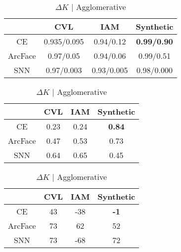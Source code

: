 \begin{table}[ht]
{        \hfill
        \begin{subtable}{0.4\linewidth}
            \centering
            \caption{RI / ARI | K-Means}
            \begin{tabular}{|c|c|c|c|}
            \hline
                & CVL & IAM & Synthetic \\
            \hline
            CE & 0.935/0.095 & 0.94/0.12 & \textbf{0.99/0.90} \\
            ArcFace & 0.97/0.05 & 0.94/0.06 & 0.99/0.51 \\
            SNN & 0.97/0.003 & 0.93/0.005 & 0.98/0.000 \\
            \hline
            \end{tabular}
        \end{subtable}
    }
    \baselineskip
    \hspace*{-4em}\scalebox{0.75} {
        \begin{subtable}{0.4\linewidth}
            \centering
            \caption{Silhouette Score | Agglomerative}
            \begin{tabular}{|c|c|c|c|}
            \hline
                & CVL & IAM & Synthetic \\
            \hline
            CE & 0.23 & 0.24 & \textbf{0.84} \\
            ArcFace & 0.47 & 0.53 & 0.73 \\
            SNN & 0.64 & 0.65 & 0.45 \\
            \hline
            \end{tabular}
        \end{subtable}
    
        \hfill
        \begin{subtable}{0.4\linewidth}
            \centering
            \caption{$\Delta K$ | Agglomerative}
            \begin{tabular}{|c|c|c|c|}
            \hline
                & CVL & IAM & Synthetic \\
            \hline
            CE & 43 & -38 & \textbf{-1} \\
            ArcFace & 73 & 62 & 52 \\
            SNN & 73 & -68 & 72 \\
            \hline
            \end{tabular}
        \end{subtable}
        
}
\end{table}
